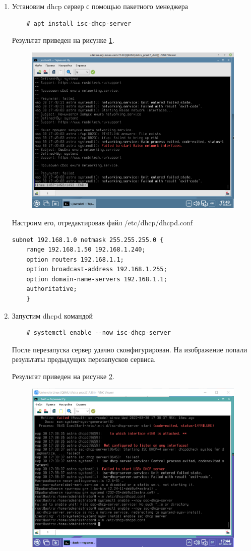 \documentclass[a4paper,14pt]{extarticle}
\begin{document}
\begin{enumerate}
	\item Установим dhcp сервер с помощью пакетного менеджера 
	\begin{lstlisting}
	# apt install isc-dhcp-server\end{lstlisting}
	
	
	Результат приведен на рисунке \ref{fig:---2022-03-30-17-49-27}.
\begin{figure}[h!]
	\centering
	\includegraphics[width=0.5\linewidth]{"images/Снимок экрана от 2022-03-30 17-49-27"}
	\caption{}
	\label{fig:---2022-03-30-17-49-27}
\end{figure}

	Настроим его, отредактировав файл /etc/dhcp/dhcpd.conf 	
	
	
	\begin{lstlisting}[caption=/etc/dhcp/dhcpd.conf, label=sdfsdf]
	subnet 192.168.1.0 netmask 255.255.255.0 {
	range 192.168.1.50 192.168.1.240;
	option routers 192.168.1.1;
	option broadcast-address 192.168.1.255;
	option domain-name-servers 192.168.1.1;
	authoritative;
	}\end{lstlisting}
	
	\item Запустим dhcpd командой
	\begin{lstlisting}
	# systemctl enable --now isc-dhcp-server\end{lstlisting}
	
	
	После перезапуска сервер удачно сконфигурирован. На изображение попали результаты предыдущих перезапусков сервиса.
	
	
	Результат приведен на рисунке \ref{fig:2022-03-3017-44-04}.
\begin{figure}[h!]
	\centering
	\includegraphics[width=0.5\linewidth]{images/Lesha/2022-03-30_17-44-04}
	\caption{}
	\label{fig:2022-03-3017-44-04}
\end{figure}
\newpage


\end{enumerate}
\end{document}
